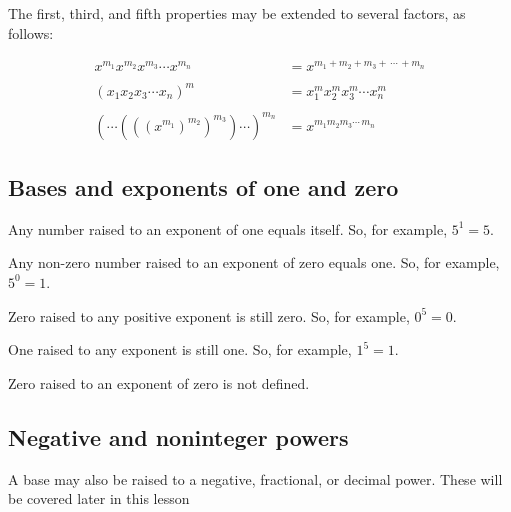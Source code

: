 The first, third, and fifth properties may be extended to several factors, as follows:



\begin{align}
x^{m _1}x^{m _2}x^{m _3} \cdots x^{m _n} & = x^{m _1+m _2+m _3+ \, \cdots \, +m _n} \\  \\ (x _1x _2x _3 \cdots x _n)^m & = x _1^m x _2^m x _3^m \cdots x _n^m \\  \\ ( \cdots (((x^{m _1})^{m _2})^{m _3}) \cdots )^{m _n} & = x^{m _1m _2m _3 \cdots \, m _n}
\end{align}






\subsection{Bases and exponents of one and zero}
\label{sss:base-8f80}




Any number raised to an exponent of one equals itself. So, for example, $5^1 = 5$.



Any non-zero number raised to an exponent of zero equals one. So, for example, $5^0 = 1$.



Zero raised to any positive exponent is still zero. So, for example, $0^5 = 0$.



One raised to any exponent is still one. So, for example, $1^5 = 1$.



Zero raised to an exponent of zero is not defined.




\subsection{Negative and noninteger powers}
\label{sss:nega-d76b}




A base may also be raised to a negative, fractional, or decimal power. These will be
covered later in this lesson




